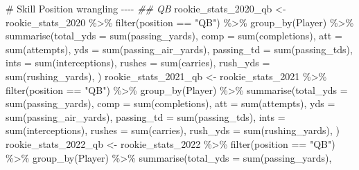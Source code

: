 \documentclass[
  letterpaper,
  DIV=11,
  numbers=noendperiod]{scrartcl}
\newenvironment{Shaded}{\begin{snugshade}}{\end{snugshade}}
\newcommand{\AttributeTok}[1]{\textcolor[rgb]{0.40,0.45,0.13}{#1}}
\newcommand{\CommentTok}[1]{\textcolor[rgb]{0.37,0.37,0.37}{#1}}
\newcommand{\DocumentationTok}[1]{\textcolor[rgb]{0.37,0.37,0.37}{\textit{#1}}}
\newcommand{\FunctionTok}[1]{\textcolor[rgb]{0.28,0.35,0.67}{#1}}
\newcommand{\NormalTok}[1]{\textcolor[rgb]{0.00,0.23,0.31}{#1}}
\newcommand{\OtherTok}[1]{\textcolor[rgb]{0.00,0.23,0.31}{#1}}
\newcommand{\SpecialCharTok}[1]{\textcolor[rgb]{0.37,0.37,0.37}{#1}}
\newcommand{\StringTok}[1]{\textcolor[rgb]{0.13,0.47,0.30}{#1}}
\begin{document}
\begin{Shaded}
\begin{Highlighting}[]
\CommentTok{\# Skill Position wrangling {-}{-}{-}{-}}
\DocumentationTok{\#\# QB}
\NormalTok{rookie\_stats\_2020\_qb }\OtherTok{\textless{}{-}}\NormalTok{ rookie\_stats\_2020 }\SpecialCharTok{\%\textgreater{}\%}
  \FunctionTok{filter}\NormalTok{(position }\SpecialCharTok{==} \StringTok{"QB"}\NormalTok{) }\SpecialCharTok{\%\textgreater{}\%}
  \FunctionTok{group\_by}\NormalTok{(Player) }\SpecialCharTok{\%\textgreater{}\%}
  \FunctionTok{summarise}\NormalTok{(}\AttributeTok{total\_yds =} \FunctionTok{sum}\NormalTok{(passing\_yards),}
            \AttributeTok{comp =} \FunctionTok{sum}\NormalTok{(completions),}
            \AttributeTok{att =} \FunctionTok{sum}\NormalTok{(attempts),}
            \AttributeTok{yds =} \FunctionTok{sum}\NormalTok{(passing\_air\_yards),}
            \AttributeTok{passing\_td =} \FunctionTok{sum}\NormalTok{(passing\_tds),}
            \AttributeTok{ints =} \FunctionTok{sum}\NormalTok{(interceptions),}
            \AttributeTok{rushes =} \FunctionTok{sum}\NormalTok{(carries),}
            \AttributeTok{rush\_yds =} \FunctionTok{sum}\NormalTok{(rushing\_yards),}
\NormalTok{            )}
\NormalTok{rookie\_stats\_2021\_qb }\OtherTok{\textless{}{-}}\NormalTok{ rookie\_stats\_2021 }\SpecialCharTok{\%\textgreater{}\%}
  \FunctionTok{filter}\NormalTok{(position }\SpecialCharTok{==} \StringTok{"QB"}\NormalTok{) }\SpecialCharTok{\%\textgreater{}\%}
  \FunctionTok{group\_by}\NormalTok{(Player) }\SpecialCharTok{\%\textgreater{}\%}
  \FunctionTok{summarise}\NormalTok{(}\AttributeTok{total\_yds =} \FunctionTok{sum}\NormalTok{(passing\_yards),}
            \AttributeTok{comp =} \FunctionTok{sum}\NormalTok{(completions),}
            \AttributeTok{att =} \FunctionTok{sum}\NormalTok{(attempts),}
            \AttributeTok{yds =} \FunctionTok{sum}\NormalTok{(passing\_air\_yards),}
            \AttributeTok{passing\_td =} \FunctionTok{sum}\NormalTok{(passing\_tds),}
            \AttributeTok{ints =} \FunctionTok{sum}\NormalTok{(interceptions),}
            \AttributeTok{rushes =} \FunctionTok{sum}\NormalTok{(carries),}
            \AttributeTok{rush\_yds =} \FunctionTok{sum}\NormalTok{(rushing\_yards),}
\NormalTok{  )}
\NormalTok{rookie\_stats\_2022\_qb }\OtherTok{\textless{}{-}}\NormalTok{ rookie\_stats\_2022 }\SpecialCharTok{\%\textgreater{}\%}
  \FunctionTok{filter}\NormalTok{(position }\SpecialCharTok{==} \StringTok{"QB"}\NormalTok{) }\SpecialCharTok{\%\textgreater{}\%}
  \FunctionTok{group\_by}\NormalTok{(Player) }\SpecialCharTok{\%\textgreater{}\%}
  \FunctionTok{summarise}\NormalTok{(}\AttributeTok{total\_yds =} \FunctionTok{sum}\NormalTok{(passing\_yards),}

\end{Highlighting}
\end{Shaded}
\end{document}
